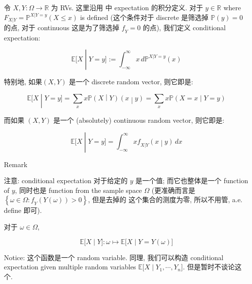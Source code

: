 \begin{definition}{}\label{def-03-joint-conditional-distribution-conditional-expectation}

令 \(\mathit{X},\mathit{Y}:\Omega\rightarrow\mathbb{R}\) 为 RVs. 这里沿用  中 expectation 的积分定义. 对于 \(\mathit{y} \in \mathbb{R}\) where \(\mathit{F}_{\mathit{X}|\mathit{Y}} = \mathbb{P}^{\mathit{X}|\mathit{Y} = \mathit{y}}(\mathit{X} \leq \mathit{x})\) is defined (这个条件对于 discrete 是筛选掉 \(\mathbb{P}(\mathit{y}) = 0\) 的点, 对于 continuous 这是为了筛选掉 \(\mathit{f}_{\mathit{Y}} = 0\) 的点), 我们定义 conditional expectation:

\[\left. \mathbb{E}\lbrack\mathit{X} \middle| \mathit{Y} = \mathit{y}\rbrack := \int_{- \infty}^{\infty}\mathit{x}\,\mathit{d}\mathbb{P}^{\mathit{X}|\mathit{Y} = \mathit{y}}(\mathit{x}) \right.\]

特别地, 如果\((\mathit{X},\mathit{Y})\) 是一个 discrete random vector, 则它即是:

\[\left. \mathbb{E}\lbrack\mathit{X} \middle| \mathit{Y} = \mathit{y}\rbrack = \sum\limits_{\mathit{x}}\mathit{x}\mathbb{P}(\mathit{X} \middle| \mathit{Y})(\mathit{x} \middle| \mathit{y}) = \sum\limits_{\mathit{x}}\mathit{x}\mathbb{P}(\mathit{X} = \mathit{x} \middle| \mathit{Y} = \mathit{y}) \right.\]

而如果 \((\mathit{X},\mathit{Y})\) 是一个 (absolutely) continuous random vector, 则它即是:

\[\left. \mathbb{E}\lbrack\mathit{X} \middle| \mathit{Y} = \mathit{y}\rbrack = \int_{- \infty}^{\infty}\mathit{x}\mathit{f}_{\mathit{X}|\mathit{Y}}(\mathit{x} \middle| \mathit{y})\,\mathit{d}\mathit{x} \right.\]

\end{definition}

\begin{qlremark}{Remark}

注意: conditional expectation 对于给定的 \(\mathit{y}\) 是一个值; 而它也整体是一个 function of \(\mathit{y}\), 同时也是 function from the sample space \(\Omega\) (更准确而言是 \(\left\{ {\mathit{\omega} \in \Omega:\mathit{f}_{\mathit{Y}}(\mathit{Y}(\mathit{\omega})) > 0} \right\}\), 但是去掉的 这个集合的测度为零, 所以不用管, a.e. define 即可).

对于 \(\mathit{\omega} \in \Omega\),

\[\left. \mathbb{E}\lbrack\mathit{X} \middle| \mathit{Y}\rbrack:\mathit{\omega}\mapsto\mathbb{E}\lbrack\mathit{X} \middle| \mathit{Y} = \mathit{Y}(\mathit{\omega})\rbrack \right.\]

Notice: 这个函数是一个 random variable. 同理, 我们可以构造 conditional expectation given multiple random variables \(\left. \mathbb{E}\lbrack\mathit{X} \middle| \mathit{Y}_{1},\cdots,\mathit{Y}_{\mathit{n}}\rbrack \right.\). 但是暂时不谈论这个.

\end{qlremark}

